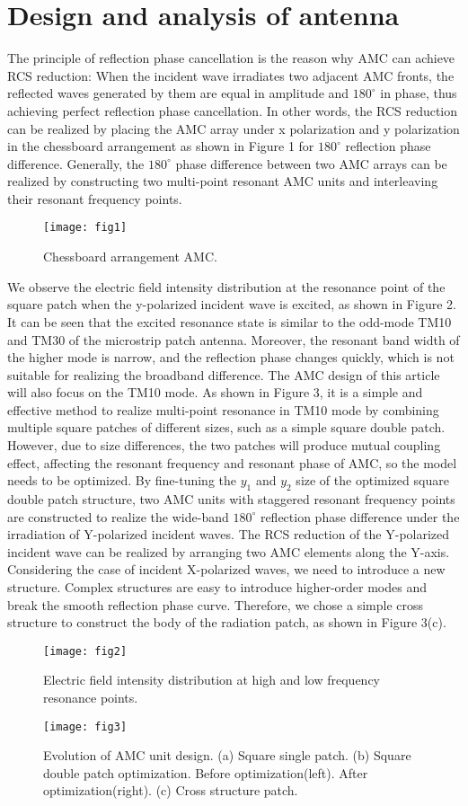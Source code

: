 \documentclass[USenglish]{article}
\theoremstyle{dgthm}
\theoremstyle{dgdef}
\begin{document}
\section{Design and analysis of antenna} 
The principle of reflection phase cancellation is the reason why AMC can achieve RCS reduction: When the incident wave irradiates two adjacent AMC fronts, the reflected waves generated by them are equal in amplitude and $180^\circ$ in phase, thus achieving perfect reflection phase cancellation. In other words, the RCS reduction can be realized by placing the AMC array under x polarization and y polarization in the chessboard arrangement as shown in Figure 1 for $180^\circ$ reflection phase difference. Generally, the $180^\circ$ phase difference between two AMC arrays can be realized by constructing two multi-point resonant AMC units and interleaving their resonant frequency points.
\begin{figure}
	\centering
	\texttt{[image: fig1]}
	\caption{Chessboard arrangement AMC.}
\end{figure}


We observe the electric field intensity distribution at the resonance point of the square patch when the y-polarized incident wave is excited, as shown in Figure 2. It can be seen that the excited resonance state is similar to the odd-mode TM10 and TM30 of the microstrip patch antenna. Moreover, the resonant band width of the higher mode is narrow, and the reflection phase changes quickly, which is not suitable for realizing the broadband difference. The AMC design of this article will also focus on the TM10 mode. As shown in Figure 3, it is a simple and effective method to realize multi-point resonance in TM10 mode by combining multiple square patches of different sizes, such as a simple square double patch. However, due to size differences, the two patches will produce mutual coupling effect, affecting the resonant frequency and resonant phase of AMC, so the model needs to be optimized. By fine-tuning the $y_1$ and $y_2$ size of the optimized square double patch structure, two AMC units with staggered resonant frequency points are constructed to realize the wide-band $180^\circ$ reflection phase difference under the irradiation of Y-polarized incident waves. The RCS reduction of the Y-polarized incident wave can be realized by arranging two AMC elements along the Y-axis. Considering the case of incident X-polarized waves, we need to introduce a new structure. Complex structures are easy to introduce higher-order modes and break the smooth reflection phase curve. Therefore, we chose a simple cross structure to construct the body of the radiation patch, as shown in Figure 3(c).
\begin{figure}
	\centering
	\texttt{[image: fig2]}
	\caption{Electric field intensity distribution at high and low frequency resonance points.}
\end{figure}
\begin{figure}
	\centering
	\texttt{[image: fig3]}
	\caption{Evolution of AMC unit design. (a) Square single patch. (b) Square double patch optimization. Before optimization(left). After optimization(right). (c) Cross structure patch. }
\end{figure}
\end{document}
